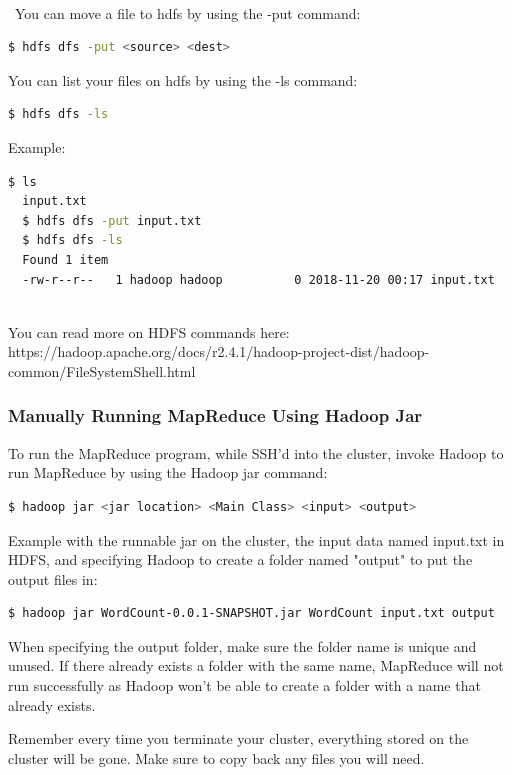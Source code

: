 \documentclass{article}
\begin{document}
\-\\\ You can move a file to hdfs by using the -put command:
\begin{lstlisting}[language=bash]
  $ hdfs dfs -put <source> <dest>
\end{lstlisting}    
You can list your files on hdfs by using the -ls command:
\begin{lstlisting}[language=bash]
  $ hdfs dfs -ls 
\end{lstlisting} 
Example:
\begin{lstlisting}[language=bash]
  $ ls
  input.txt
  $ hdfs dfs -put input.txt 
  $ hdfs dfs -ls 
  Found 1 item 
  -rw-r--r--   1 hadoop hadoop          0 2018-11-20 00:17 input.txt
\end{lstlisting} 

\-\ \\ You can read more on HDFS commands here:\\ https://hadoop.apache.org/docs/r2.4.1/hadoop-project-dist/hadoop-common/FileSystemShell.html
 
 \subsubsection{Manually Running MapReduce Using Hadoop Jar}
To run the MapReduce program, while SSH'd into the cluster, invoke Hadoop to run MapReduce by using the Hadoop jar command:
\begin{lstlisting}[language=bash]
  $ hadoop jar <jar location> <Main Class> <input> <output>
\end{lstlisting}
Example with the runnable jar on the cluster, the input data named input.txt in HDFS, and specifying Hadoop to create a folder named "output" to put the output files in:
\begin{lstlisting}[language=bash]
  $ hadoop jar WordCount-0.0.1-SNAPSHOT.jar WordCount input.txt output
\end{lstlisting}


\begin{info}
When specifying the output folder, make sure the folder name is unique and unused. If there already exists a folder with the same name, MapReduce will not run successfully as Hadoop won't be able to create a folder with a name that already exists.
\end{info}

 \begin{info}
Remember every time you terminate your cluster, everything stored on the cluster will be gone. Make sure to copy back any files you will need.
\end{info}
\end{document}
